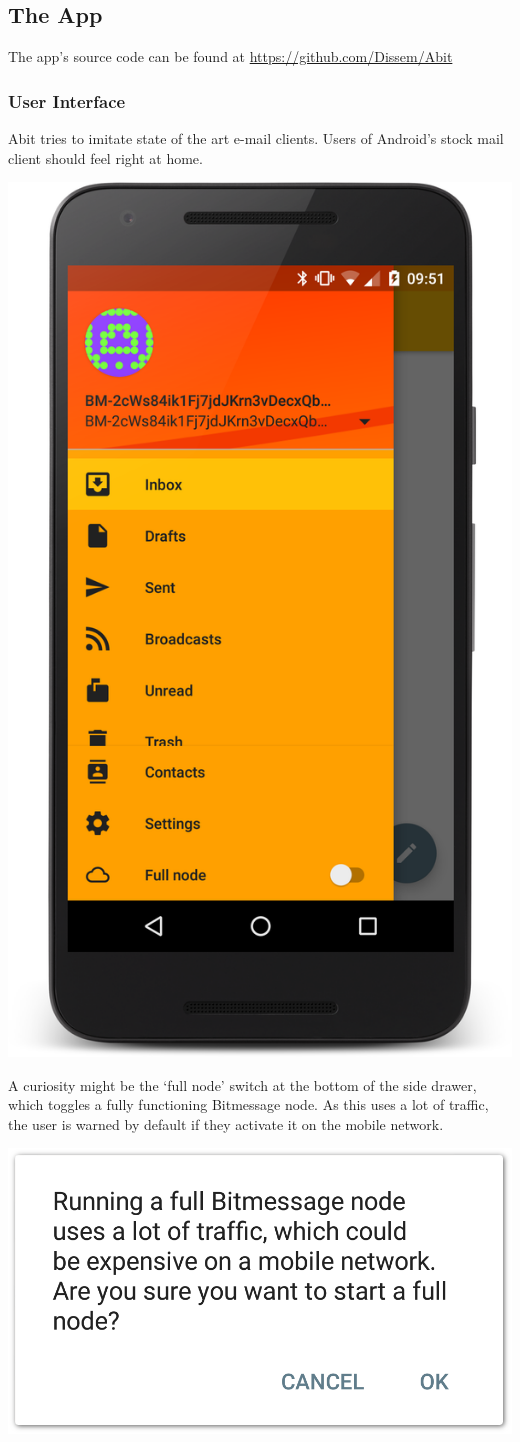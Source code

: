 \documentclass{bfh}
\begin{document}
  \subsection{The App}
  The app's source code can be found at \url{https://github.com/Dissem/Abit}

  \subsubsection{User Interface}
  Abit tries to imitate state of the art e-mail clients. Users of Android's stock mail client should feel right at home.

  \begin{center}
    \includegraphics[width=0.4 \textwidth]{images/screenshot_drawer_menu.png}
  \end{center}

  A curiosity might be the `full node' switch at the bottom of the side drawer, which toggles a fully functioning Bitmessage node. As this uses a lot of traffic, the user is warned by default if they activate it on the mobile network.

  \begin{center}
    \includegraphics[width=0.4 \textwidth]{images/screenshot_warning_dialog.png}
  \end{center}
\end{document}
